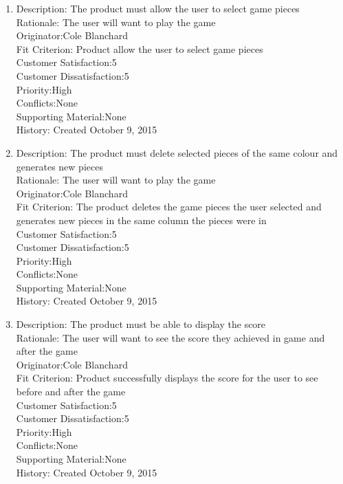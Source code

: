 \documentclass[12pt]{article}
\begin{document}
\begin{enumerate}
 \item Description: The product must allow the user to select game pieces\\
 Rationale: The user will want to play the game\\
 Originator:Cole Blanchard\\
 Fit Criterion: Product allow the user to select game pieces\\
 Customer Satisfaction:5\\
 Customer Dissatisfaction:5\\
 Priority:High\\
 Conflicts:None\\
 Supporting Material:None\\
 History: Created October 9, 2015\\
 
 \item Description: The product must delete selected pieces of the same colour and generates new pieces\\
 Rationale: The user will want to play the game\\
 Originator:Cole Blanchard\\
 Fit Criterion: The product deletes the game pieces the user selected and generates new pieces in the same column the pieces were in\\
 Customer Satisfaction:5\\
 Customer Dissatisfaction:5\\
 Priority:High\\
 Conflicts:None\\
 Supporting Material:None\\
 History: Created October 9, 2015\\
 
 \item Description: The product must be able to display the score\\
 Rationale: The user will want to see the score they achieved in game and after the game\\
 Originator:Cole Blanchard\\
 Fit Criterion: Product successfully displays the score for the user to see before and after the game \\
 Customer Satisfaction:5\\
 Customer Dissatisfaction:5\\
 Priority:High\\
 Conflicts:None\\
 Supporting Material:None\\
 History: Created October 9, 2015\\
 
\end{enumerate}
\end{document}
